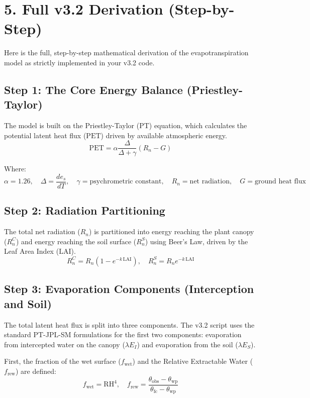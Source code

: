 \documentclass[11pt]{article}
\begin{document}
\section*{5. Full v3.2 Derivation (Step-by-Step)}

Here is the full, step-by-step mathematical derivation of the evapotranspiration model as strictly implemented in your v3.2 code.

\subsection*{Step 1: The Core Energy Balance (Priestley-Taylor)}

The model is built on the Priestley-Taylor (PT) equation, which calculates the potential latent heat flux ($\mathrm{PET}$) driven by available atmospheric energy.
\[
  \mathrm{PET} = \alpha \frac{\Delta}{\Delta + \gamma} (R_n - G)
\]

Where:
\[
  \alpha = 1.26,\quad \Delta = \frac{d e_s}{dT},\quad \gamma = \text{psychrometric constant},\quad R_n = \text{net radiation},\quad G = \text{ground heat flux}
\]

\subsection*{Step 2: Radiation Partitioning}

The total net radiation ($R_n$) is partitioned into energy reaching the plant canopy ($R_n^C$) and energy reaching the soil surface ($R_n^S$) using Beer's Law, driven by the Leaf Area Index ($\mathrm{LAI}$).
\[
  R_n^C = R_n\left(1 - e^{-k\,\mathrm{LAI}}\right),\quad R_n^S = R_n e^{-k\,\mathrm{LAI}}
\]

\subsection*{Step 3: Evaporation Components (Interception and Soil)}

The total latent heat flux is split into three components. The v3.2 script uses the standard PT-JPL-SM formulations for the first two components: evaporation from intercepted water on the canopy ($\lambda E_I$) and evaporation from the soil ($\lambda E_S$).

First, the fraction of the wet surface ($f_{\mathrm{wet}}$) and the Relative Extractable Water ($f_{\mathrm{rew}}$) are defined:
\[
  f_{\mathrm{wet}} = \mathrm{RH}^4,\quad f_{\mathrm{rew}} = \frac{\theta_{\mathrm{obs}} - \theta_{\mathrm{wp}}}{\theta_{\mathrm{fc}} - \theta_{\mathrm{wp}}}
\]
\end{document}
